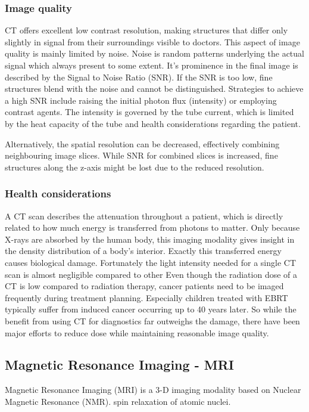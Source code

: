 \subsubsection{Image quality} %
CT offers excellent low contrast resolution, making structures that differ only slightly in signal from their surroundings visible to doctors.
This aspect of image quality is mainly limited by noise.
Noise is random patterns underlying the actual signal which always present to some extent.
It's prominence in the final image is described by the Signal to Noise Ratio (SNR).
If the SNR is too low, fine structures blend with the noise and cannot be distinguished. 
Strategies to achieve a high SNR include raising the initial photon flux (intensity) or employing contrast agents.
The intensity is governed by the tube current, which is limited by the heat capacity of the tube and health considerations regarding the patient.

Alternatively, the spatial resolution can be decreased, effectively combining neighbouring image slices.
While SNR for combined slices is increased, fine structures along the z-axis might be lost due to the reduced resolution.

\subsubsection{Health considerations}
A CT scan describes the attenuation throughout a patient, which is directly related to how much energy is transferred from photons to matter.
Only because X-rays are absorbed by the human body, this imaging modality gives insight in the density distribution of a body's interior.
Exactly this transferred energy causes biological damage.
Fortunately the light intensity needed for a single CT scan is almost negligible compared to other 
Even though the radiation dose of a CT is low compared to radiation therapy, cancer patients need to be imaged frequently during treatment planning.
Especially children treated with EBRT typically suffer from induced cancer occurring up to 40 years later.
So while the benefit from using CT for diagnostics far outweighs the damage, there have been major efforts to reduce dose while maintaining reasonable image quality.
\cite{Murphy2007, Brenner2001, Sodickson2009, Smith2007, McCollough2009, Goldman2013}


\subsection{Magnetic Resonance Imaging - MRI}
Magnetic Resonance Imaging (MRI) is a 3-D imaging modality based on  Nuclear Magnetic Resonance (NMR).
spin relaxation of atomic nuclei.


